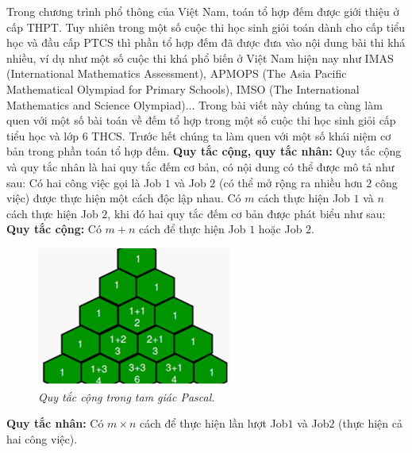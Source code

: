 \begin{multicols}{2}
	Trong chương trình phổ thông của Việt Nam, toán tổ hợp đếm được giới thiệu ở cấp THPT. Tuy nhiên trong một số cuộc thi học sinh giỏi toán dành cho cấp tiểu học và đầu cấp PTCS thì phần tổ hợp đếm đã được đưa vào nội dung bài thi khá nhiều, ví dụ như một số cuộc thi khá phổ biến ở Việt Nam hiện nay như IMAS (International Mathematics Assessment), APMOPS (The Asia Pacific Mathematical Olympiad for Primary Schools), IMSO (The International Mathematics and Science Olympiad)...
	\vskip 0.1cm
	Trong bài viết này chúng ta cùng làm quen với một số bài toán về đếm tổ hợp trong một số cuộc thi học sinh giỏi cấp tiểu học và lớp $6$ THCS.
	\vskip 0.1cm
	Trước hết chúng ta làm quen với một số khái niệm cơ bản trong phần toán tổ hợp đếm.
	\vskip 0.1cm
	\textbf{\color{toancuabi}Quy tắc cộng, quy tắc nhân:} Quy tắc cộng và quy tắc nhân là hai quy tắc đếm cơ bản, có nội dung có thể được mô tả như sau:
	\vskip 0.1cm
	Có hai công việc gọi là Job $1$ và Job $2$ (có thể mở rộng ra nhiều hơn $2$ công việc) được thực hiện một cách độc lập nhau. Có $m$ cách thực hiện Job $1$ và $n$ cách thực hiện Job $2$, khi đó hai quy tắc đếm cơ bản được phát biểu như sau:
	\vskip 0.1cm
	\textbf{\color{toancuabi}Quy tắc cộng:} Có $m+n$ cách để thực hiện Job $1$ hoặc Job $2$.
	\begin{figure}[H]
		\centering
		\vspace*{-5pt}
		\captionsetup{labelformat=empty, justification=centering}
		\includegraphics[width=0.8\linewidth]{_1}
		\caption{\small\textit{\color{toancuabi}Quy tắc cộng trong tam giác Pascal.}}
		\vspace*{-10pt}
	\end{figure}
	\textbf{\color{toancuabi}Quy tắc nhân:} Có $m\times n$ cách để thực hiện lần lượt Job$1$ và Job$2$ (thực hiện cả hai công việc).

\end{multicols}
